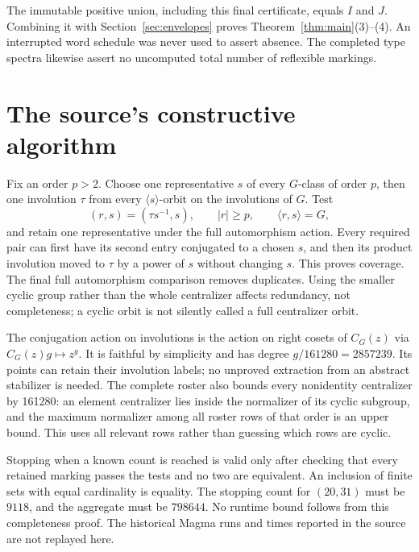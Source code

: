 \documentclass[11pt,a4paper]{article}
\newcommand{\gen}[1]{\langle #1\rangle}
\begin{document}
The immutable positive union, including this final certificate, equals
$I$ and $J$. Combining it with Section~\ref{sec:envelopes} proves
Theorem~\ref{thm:main}(3)--(4). An interrupted word schedule was never
used to assert absence. The completed type spectra likewise assert no
uncomputed total number of reflexible markings.

\section{The source's constructive algorithm}\label{sec:algorithm}
Fix an order $p>2$. Choose one representative $s$ of every $G$-class
of order $p$, then one involution $\tau$ from every $\gen s$-orbit on
the involutions of $G$. Test
\[
 (r,s)=(\tau s^{-1},s),\qquad |r|\geq p,\qquad\gen{r,s}=G,
\]
and retain one representative under the full automorphism action.
Every required pair can first have its second entry conjugated to a
chosen $s$, and then its product involution moved to $\tau$ by a power
of $s$ without changing $s$. This proves coverage. The final full
automorphism comparison removes duplicates. Using the smaller cyclic
group rather than the whole centralizer affects redundancy, not
completeness; a cyclic orbit is not silently called a full centralizer
orbit.

The conjugation action on involutions is the action on right cosets of
$C_G(z)$ via $C_G(z)g\mapsto z^g$. It is faithful by simplicity and has
degree $g/161280=2857239$. Its points can retain their involution labels;
no unproved extraction from an abstract stabilizer is needed. The complete
roster also bounds every nonidentity centralizer by 161280: an element
centralizer lies inside the normalizer of its cyclic subgroup, and the
maximum normalizer among all roster rows of that order is an upper bound.
This uses all relevant rows rather than guessing which rows are cyclic.

Stopping when a known count is reached is valid only after checking that
every retained marking passes the tests and no two are equivalent. An
inclusion of finite sets with equal cardinality is equality. The stopping
count for $(20,31)$ must be $9118$, and the aggregate must be $798644$.
No runtime bound follows from this completeness proof. The historical
Magma runs and times reported in the source are not replayed here.
\end{document}
